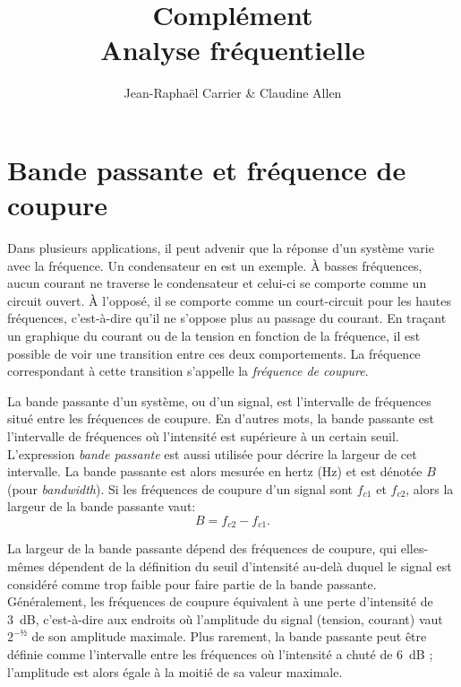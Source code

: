 \documentclass[12pt,oneside,letterpaper]{article}
\begin{document}
\title{\textbf{Complément}\\Analyse fréquentielle}
\author{Jean-Raphaël Carrier \& Claudine Allen}
\date{}
\maketitle


\section{Bande passante et fréquence de coupure}

Dans plusieurs applications, il peut advenir que la réponse d'un système varie avec la fréquence. Un condensateur en est un exemple. À basses fréquences, aucun courant ne traverse le condensateur et celui-ci se comporte comme un circuit ouvert. À l'opposé, il se comporte comme un court-circuit pour les hautes fréquences, c'est-à-dire qu'il ne s'oppose plus au passage du courant. En traçant un graphique du courant ou de la tension en fonction de la fréquence, il est possible de voir une transition entre ces deux comportements. La fréquence correspondant à cette transition s'appelle la \textit{fréquence de coupure}.

La bande passante d'un système, ou d'un signal, est l'intervalle de fréquences situé entre les fréquences de coupure. En d'autres mots, la bande passante est l'intervalle de fréquences où l'intensité est supérieure à un certain seuil. L'expression \textit{bande passante} est aussi utilisée pour décrire la largeur de cet intervalle. La bande passante est alors mesurée en hertz (Hz) et est dénotée $B$ (pour \textit{bandwidth}). Si les fréquences de coupure d'un signal sont $f_{c1}$ et $f_{c2}$, alors la largeur de la bande passante vaut:
\begin{equation}
B=f_{c2}-f_{c1}.
\end{equation}

La largeur de la bande passante dépend des fréquences de coupure, qui elles-mêmes dépendent de la définition du seuil d'intensité au-delà duquel le signal est considéré comme trop faible pour faire partie de la bande passante. Généralement, les fréquences de coupure équivalent à une perte d'intensité de 3~dB, c'est-à-dire aux endroits où l'amplitude du signal (tension, courant) vaut $2^{-½}$ de son amplitude maximale. Plus rarement, la bande passante peut être définie comme l'intervalle entre les fréquences où l'intensité a chuté de 6~dB ; l'amplitude est alors égale à la moitié de sa valeur maximale.
\end{document}
